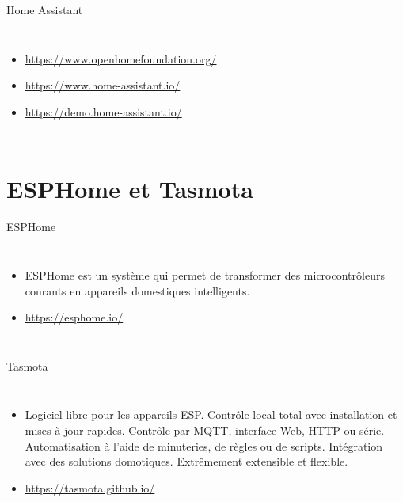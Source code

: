\documentclass[aspectratio=169,xcolor=dvipsnames]{beamer}
\begin{document}
\begin{frame}{Home Assistant}
    \begin{columns}[c] %

        \begin{itemize}
            \item \url{https://www.openhomefoundation.org/}
            \item \url{https://www.home-assistant.io/}
            \item \url{https://demo.home-assistant.io/}
        \end{itemize}

    \end{columns}
\end{frame}

\section{ESPHome et Tasmota}

\begin{frame}{ESPHome}
    \begin{columns}[c] %

        \begin{itemize}
            \item ESPHome est un système qui permet de transformer des microcontrôleurs courants en appareils domestiques intelligents.
            \item \url{https://esphome.io/}
        \end{itemize}

    \end{columns}
\end{frame}

\begin{frame}{Tasmota}
    \begin{columns}[c] %

        \begin{itemize}
            \item Logiciel libre pour les appareils ESP. Contrôle local total avec installation et mises à jour rapides. Contrôle par MQTT, interface Web, HTTP ou série. Automatisation à l'aide de minuteries, de règles ou de scripts. Intégration avec des solutions domotiques. Extrêmement extensible et flexible.
            \item \url{https://tasmota.github.io/}
        \end{itemize}

    \end{columns}
\end{frame}
\end{document}
